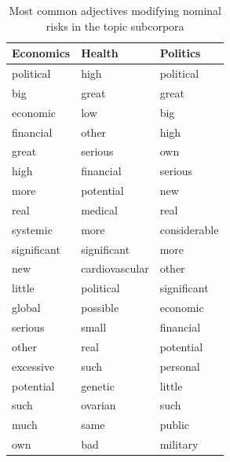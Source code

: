 		 	\begin{table}[htb!]
		 	\centering
		 	\small
		 	\begin{tabular}{|l|l|l|}
		 			 	\hline
		 			 	\textbf{Economics}   & \textbf{Health}         & \textbf{Politics}     \\ \hline
		 			 	political   & high           & political    \\ \hline
		 			 	big         & great          & great        \\ \hline
		 			 	economic    & low            & big          \\ \hline
		 			 	financial   & other          & high         \\ \hline
		 			 	great       & serious        & own          \\ \hline
		 			 	high        & financial      & serious      \\ \hline
		 			 	more        & potential      & new          \\ \hline
		 			 	real        & medical        & real         \\ \hline
		 			 	systemic    & more           & considerable \\ \hline
		 			 	significant & significant    & more         \\ \hline
		 			 	new         & cardiovascular & other        \\ \hline
		 			 	little      & political      & significant  \\ \hline
		 			 	global      & possible       & economic     \\ \hline
		 			 	serious     & small          & financial    \\ \hline
		 			 	other       & real           & potential    \\ \hline
		 			 	excessive   & such           & personal     \\ \hline
		 			 	potential   & genetic        & little       \\ \hline
		 			 	such        & ovarian        & such         \\ \hline
		 			 	much        & same           & public       \\ \hline
		 			 	own         & bad            & military     \\ \hline
		 			 	\end{tabular}
		 			 	\caption{Most common adjectives modifying nominal risks in the topic subcorpora}
		 			 	\label{tab:echepo_adjmod}
		 	\end{table}

